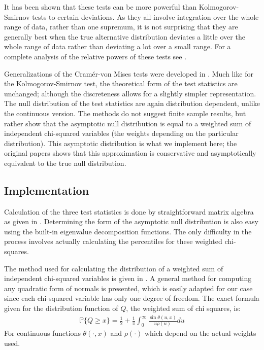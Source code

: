 It has been shown that these tests can be more powerful than Kolmogorov-Smirnov tests to certain deviations. As they all involve
integration over the whole range of data, rather than one supremum, it is not surprising that they are generally best when the
true alternative distribution deviates a little over the whole range of data rather than deviating a lot over a small range. For
a complete analysis of the relative powers of these tests see \cite{stephens1974}.

Generalizations of the Cram\'{e}r-von Mises tests were developed in \cite{choulakian1994}. Much like for the Kolmogorov-Smirnov test,
the theoretical form of the test statistics are unchanged; although the discreteness allows for a slightly simpler representation.
The null distribution of the test statistics are again distribution dependent, unlike the continuous version. The methods do not
suggest finite sample results, but rather show that the asymptotic null distribution is equal to a weighted sum of independent
chi-squared variables (the weights depending on the particular distribution). This asymptotic distribution is what we implement here;
the original papers shows that this approximation is conservative and asymptotically equivalent to the true null distribution.

\subsection{Implementation}

Calculation of the three test statistics is done by straightforward matrix algebra as given in \cite{choulakian1994}. Determining 
the form of the asymptotic null distribution is also easy using the built-in eigenvalue decomposition functions. The only 
difficulty in the process involves actually calculating the percentiles for these weighted chi-squares. 

The method used for calculating the distribution of a weighted sum of independent chi-squared variables is given in \cite{imhof1961}.
A general method for computing any quadratic form of normals is presented, which is easily adapted for our case since
each chi-squared variable has only one degree of freedom. The exact formula given for the distribution function of $Q$, the weighted
sum of chi squares, is:
\begin{align}
\mathbb{P}\{Q \geq x \} = \frac{1}{2} + \frac{1}{\pi} \int_{0}^{\infty} \frac{\sin\theta(u,x)}{u \rho(u) } du
\end{align}
For continuous functions $\theta(\cdot, x)$ and $\rho(\cdot)$ which depend on the actual weights used. 


